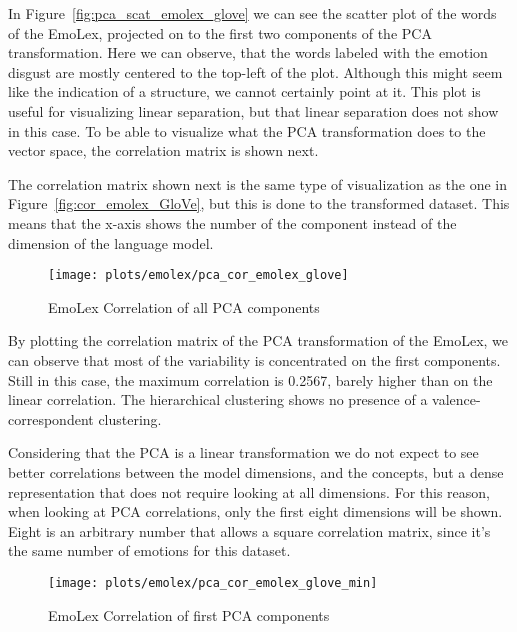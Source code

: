 In Figure~\ref{fig:pca_scat_emolex_glove} we can see the scatter plot of the words of the EmoLex, projected on to the first two components of the PCA transformation. Here we can observe, that the words labeled with the emotion disgust are mostly centered to the top-left of the plot. Although this might seem like the indication of a structure, we cannot certainly point at it. This plot is useful for visualizing linear separation, but that linear separation does not show in this case. To be able to visualize what the PCA transformation does to the vector space, the correlation matrix is shown next.

The correlation matrix shown next is the same type of visualization as the one in Figure~\ref{fig:cor_emolex_GloVe}, but this is done to the transformed dataset. This means that the x-axis shows the number of the component instead of the dimension of the language model.

\begin{figure}[H]
  \texttt{[image: plots/emolex/pca\_cor\_emolex\_glove]}
  \centering
  \caption{EmoLex Correlation of all PCA components}\label{fig:pca_cor_emolex_glove}
\end{figure}

By plotting the correlation matrix of the PCA transformation of the EmoLex, we can observe that most of the variability is concentrated on the first components. Still in this case, the maximum correlation is 0.2567, barely higher than on the linear correlation. The hierarchical clustering shows no presence of a valence-correspondent clustering.

Considering that the PCA is a linear transformation we do not expect to see better correlations between the model dimensions, and the concepts, but a dense representation that does not require looking at all dimensions. For this reason, when looking at PCA correlations, only the first eight dimensions will be shown. Eight is an arbitrary number that allows a square correlation matrix, since it's the same number of emotions for this dataset.

\begin{figure}[H]
  \texttt{[image: plots/emolex/pca\_cor\_emolex\_glove\_min]}
  \centering
  \caption{EmoLex Correlation of first PCA components}\label{fig:pca_cor_emolex_glove_min}
\end{figure}

